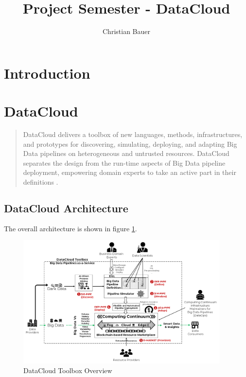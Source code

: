 \documentclass{article}
\title{Project Semester - DataCloud}
\author{Christian Bauer}
\begin{document}
    \maketitle

    \tableofcontents
    \lstlistoflistings
    \pagebreak

    \section{Introduction}
    \label{sec:introduction}


    \section{DataCloud}
    \label{sec:datacloud}



        \begin{quote}
            DataCloud delivers a toolbox of new languages, methods, infrastructures, and prototypes for discovering, simulating, deploying, and adapting Big Data pipelines on heterogeneous and untrusted resources. DataCloud separates the design from the run-time aspects of Big Data pipeline deployment, empowering domain experts to take an active part in their definitions \cite{dumitruProjectProjectDataCloud}.
        \end{quote}

        \subsection{DataCloud Architecture}
        \label{sec:architecture-datacloud}


            The overall architecture is shown in figure \ref{fig:datacloud-toolbox-overview}.

            \begin{figure}[h!]
                \centering
                \includegraphics[width=0.95\textwidth]{figures/datacloud_toolbox.png}
                \caption{DataCloud Toolbox Overview \cite{dumitruDataCloudToolbox}}
                \label{fig:datacloud-toolbox-overview}
            \end{figure}
            
\end{document}
